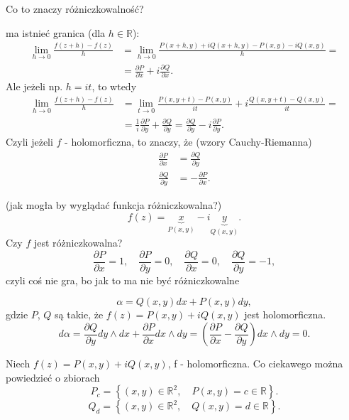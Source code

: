 \documentclass[../main.tex]{subfiles}
\begin{document}
\begin{pytanie}
    Co to znaczy różniczkowalność?
\end{pytanie}
ma istnieć granica (dla $h\in \mathbb{R}$):
\begin{align*}
    \lim_{h \to 0} \frac{f(z+h) - f(z)}{h} &= \lim_{h \to 0} \frac{P(x+h, y) + iQ(x + h, y) - P(x,y) - iQ(x,y)}{h} =\\
    &= \frac{\partial P}{\partial x} + i \frac{\partial Q}{\partial x}
.\end{align*}
Ale jeżeli np. $h = it$, to wtedy
\begin{align*}
    \lim_{h \to 0}\frac{f(z+h) - f(z)}{h} &= \lim_{t \to 0}\frac{P(x, y+t) - P(x,y)}{it} + i \frac{Q(x, y+t) - Q(x,y)}{it} =\\
    &= \frac{1}{i} \frac{\partial P}{\partial y} + \frac{\partial Q}{\partial y} = \frac{\partial Q}{\partial y} - i \frac{\partial P}{\partial y}
.\end{align*}
Czyli jeżeli $f$ - holomorficzna, to znaczy, że (wzory Cauchy-Riemanna)
\begin{align*}
    \frac{\partial P}{\partial x} &= \frac{\partial Q}{\partial y}\\
    \frac{\partial Q}{\partial y} &= - \frac{\partial P}{\partial x}
.\end{align*}
\begin{przyklad}
    (jak mogła by wyglądać funkcja różniczkowalna?)
    \[
        f(z) = \underbrace{x}_{P(x,y)} - i\underbrace{y}_{Q(x,y)}
    .\]
Czy $f$ jest różniczkowalna?
\[
\frac{\partial P}{\partial x} = 1,\quad \frac{\partial P}{\partial y} = 0,\quad \frac{\partial Q}{\partial x}  = 0,\quad \frac{\partial Q}{\partial y} = -1
,\]
czyli coś nie gra, bo jak to ma nie być różniczkowalne
\end{przyklad}
\begin{przyklad}
    \[
        \alpha = Q(x,y)dx + P(x,y)dy
    ,\]
gdzie $P$, $Q$ są takie, że $f(z) = P(x,y) + iQ(x,y)$ jest holomorficzna.
\[
    d\alpha = \frac{\partial Q}{\partial y} dy\land dx + \frac{\partial P}{\partial x} dx\land dy = \left( \frac{\partial P}{\partial x} - \frac{\partial Q}{\partial y}  \right) dx\land dy = 0
.\]
\end{przyklad}
\begin{pytanie}
    Niech $f(z) = P(x,y) + iQ(x,y)$, f - holomorficzna. Co ciekawego można powiedzieć o zbiorach
    \[
        P_c = \left\{ (x,y)\in \mathbb{R}^2,\quad P(x,y) = c\in\mathbb{R} \right\}
    .\]
    \[
        Q_d = \left\{ (x,y)\in \mathbb{R}^2,\quad Q(x,y) = d\in \mathbb{R} \right\}
    .\]
\end{pytanie}
\end{document}
